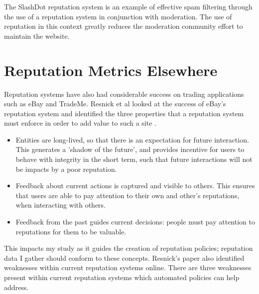 The SlashDot reputation system is an example of effective spam filtering through the use of a reputation system in conjunction with moderation. The use of reputation in this context greatly reduces the moderation community effort to maintain the website. 




\section{Reputation Metrics Elsewhere}

Reputation systems have also had considerable success on trading applications such as eBay and TradeMe. Resnick et al looked at the success of eBay's reputation system and identified the three properties that a reputation system must enforce in order to add value to such a site \cite{}. 

\begin{itemize}
 \item Entities are long-lived, so that there is an expectation for future interaction. This generates a 'shadow of the future', and provides incentive for users to behave with integrity in the short term, such that future interactions will not be impacts by a poor reputation. 
 \item Feedback about current actions is captured and visible to others. This ensures that users are able to pay attention to their own and other's reputations, when interacting with others. 
 \item Feedback from the past guides current decisions: people must pay attention to reputations for them to be valuable. 
\end{itemize}

This impacts my study as it guides the creation of reputation policies; reputation data I gather should conform to these concepts. Resnick's paper also identified weaknesses within current reputation systems online. There are three weaknesses present within current reputation systems which automated policies can help address. 

